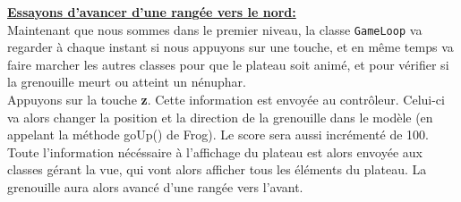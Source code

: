 \documentclass[a4paper, 12pt]{article}
\begin{document}
\underline{\textbf{Essayons d'avancer d'une rangée vers le nord:}} \vspace{0.1cm} \\
Maintenant que nous sommes dans le premier niveau, la classe \texttt{GameLoop} va 
regarder à chaque instant si nous appuyons sur une touche, et en même temps va
faire marcher les autres classes pour que le plateau soit animé, et 
pour vérifier si la grenouille meurt ou atteint un nénuphar. \\
Appuyons sur la touche \textbf{z}. Cette information est envoyée au contrôleur.
Celui-ci va alors changer la position et la direction de la grenouille dans le modèle (en appelant la méthode goUp() de Frog).
Le score sera aussi incrémenté de 100. \\
Toute l'information nécéssaire à l'affichage du plateau est alors envoyée aux classes
gérant la vue, qui vont alors afficher tous les éléments du plateau. La grenouille aura
alors avancé d'une rangée vers l'avant. 
\end{document}
